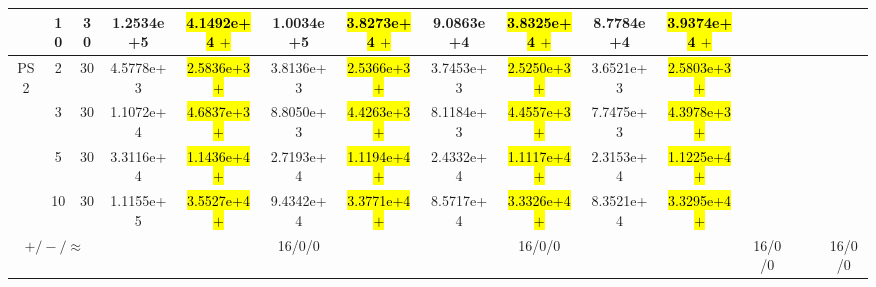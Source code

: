\documentclass[journal]{IEEEtran}
\begin{document}
\begin{table*}[htbp]
\begin{tabular}{ccccccccccccccc}
                      &10& 30&1.2534e+5&\hl{4.1492e+4 $+$}&1.0034e+5&\hl{3.8273e+4 $+$}&9.0863e+4&\hl{3.8325e+4 $+$}&8.7784e+4&\hl{3.9374e+4 $+$}}\\
\hline                                                                                                                                              
\multirow{4}{*}{PS2}  & 2& 30&4.5778e+3&\hl{2.5836e+3 $+$}&3.8136e+3&\hl{2.5366e+3 $+$}&3.7453e+3&\hl{2.5250e+3 $+$}&3.6521e+3&\hl{2.5803e+3 $+$}}\\
                      & 3& 30&1.1072e+4&\hl{4.6837e+3 $+$}&8.8050e+3&\hl{4.4263e+3 $+$}&8.1184e+3&\hl{4.4557e+3 $+$}&7.7475e+3&\hl{4.3978e+3 $+$}}\\
                      & 5& 30&3.3116e+4&\hl{1.1436e+4 $+$}&2.7193e+4&\hl{1.1194e+4 $+$}&2.4332e+4&\hl{1.1117e+4 $+$}&2.3153e+4&\hl{1.1225e+4 $+$}}\\
                      &10& 30&1.1155e+5&\hl{3.5527e+4 $+$}&9.4342e+4&\hl{3.3771e+4 $+$}&8.5717e+4&\hl{3.3326e+4 $+$}&8.3521e+4&\hl{3.3295e+4 $+$}}\\
\hline                                                                                                                     
\multicolumn{3}{c}{$+/-/\approx$}&&&16/0/0&&&16/0/0&&&16/0/0&&&16/0/0\\                                                             
\bottomrule
\end{tabular}
\label{No Label}
\end{table*}
\end{document}
